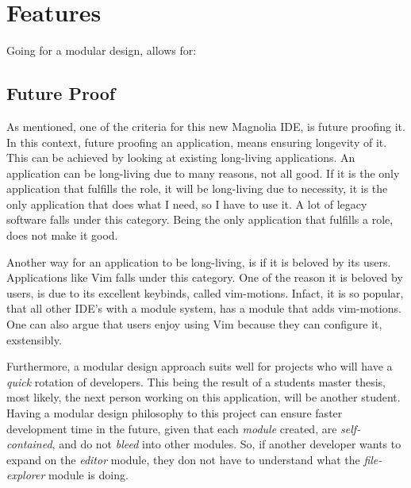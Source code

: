 \documentclass[runningheads]{llncs}
\begin{document}
\section{Features}
Going for a modular design, allows for:

\subsection{Future Proof}
As mentioned, one of the criteria for this new Magnolia IDE, is future proofing
it. In this context, future proofing an application, means ensuring longevity of
it. This can be achieved by looking at existing long-living applications. An
application can be long-living due to many reasons, not all good. If it is the
only application that fulfills the role, it will be long-living due to
necessity, it is the only application that does what I need, so I have to use
it. A lot of legacy software falls under this category. Being the only
application that fulfills a role, does not make it good.

Another way for an application to be long-living, is if it is beloved by its
users. Applications like Vim falls under this category. One of the reason it is
beloved by users, is due to its excellent keybinds, called vim-motions. Infact,
it is so popular, that all other IDE's with a module system, has a module that
adds vim-motions. One can also argue that users enjoy using Vim because they can
configure it, exstensibly.

Furthermore, a modular design approach suits well for projects who will have a
\textit{quick} rotation of developers. This being the result of a students
master thesis, most likely, the next person working on this application, will be
another student. Having a modular design philosophy to this project can ensure
faster development time in the future, given that each \textit{module} created,
are \textit{self-contained}, and do not \textit{bleed} into other modules. So,
if another developer wants to expand on the \textit{editor} module, they don not
have to understand what the \textit{file-explorer} module is doing.
\end{document}
